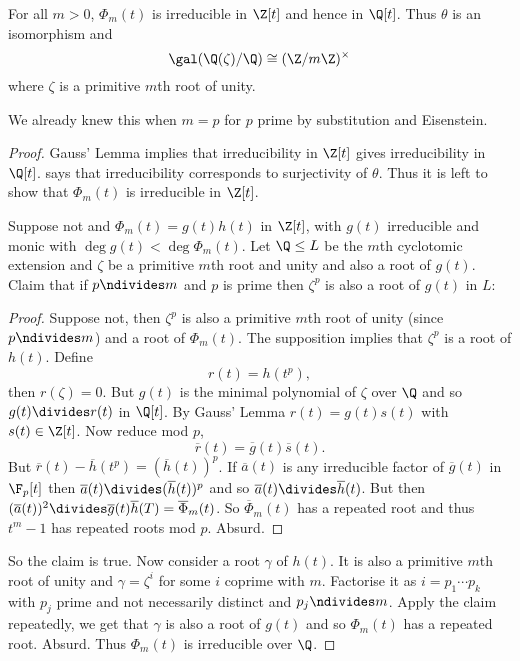 \documentclass[a4paper]{article}
\newcommand*{\red}[1]{\overline{#1}}
\begin{document}
\begin{theorem}
  \label{thm:cyclotomic extension of Q}
  For all \(m > 0\), \(\Phi_m(t)\) is irreducible in \(\Z[t]\) and hence in \(\Q[t]\). Thus \(\theta\) is an isomorphism and
  \[
    \gal(\Q(\zeta)/\Q) \cong (\Z/m\Z)^\times
  \]
  where \(\zeta\) is a primitive \(m\)th root of unity.
\end{theorem}

\begin{remark}
  We already knew this when \(m = p\) for \(p\) prime by substitution and Eisenstein.
\end{remark}

\begin{proof}
  Gauss' Lemma implies that irreducibility in \(\Z[t]\) gives irreducibility in \(\Q[t]\).  says that irreducibility corresponds to surjectivity of \(\theta\). Thus it is left to show that \(\Phi_m(t)\) is irreducible in \(\Z[t]\).

  Suppose not and \(\Phi_m(t) = g(t)h(t)\) in \(\Z[t]\), with \(g(t)\) irreducible and monic with \(\deg g(t) < \deg \Phi_m(t)\). Let \(\Q \leq L\) be the \(m\)th cyclotomic extension and \(\zeta\) be a primitive \(m\)th root and unity and also a root of \(g(t)\). Claim that if \(p \ndivides m\) and \(p\) is prime then \(\zeta^p\) is also a root of \(g(t)\) in \(L\):

  \begin{proof}
    Suppose not, then \(\zeta^p\) is also a primitive \(m\)th root of unity (since \(p \ndivides m\)) and a root of \(\Phi_m(t)\). The supposition implies that \(\zeta^p\) is a root of \(h(t)\). Define
    \[
      r(t) = h(t^p),
    \]
    then \(r(\zeta) = 0\). But \(g(t)\) is the minimal polynomial of \(\zeta\) over \(\Q\) and so \(g(t) \divides r(t)\) in \(\Q[t]\). By Gauss' Lemma \(r(t) = g(t)s(t)\) with \(s(t) \in \Z[t]\). Now reduce mod \(p\),
    \[
      \red r(t) = \red g(t) \red s(t).
    \]
    But \(\red r(t) - \red h(t^p) = (\red h(t))^p\). If \(\red a(t)\) is any irreducible factor of \(\red g(t)\) in \(\F_p[t]\) then \(\red a(t) \divides (\red h(t))^p\) and so \(\red a(t) \divides \red h(t)\). But then \((\red a(t))^2 \divides \red g(t) \red h(T) = \red \Phi_m(t)\). So \(\red \Phi_m(t)\) has a repeated root and thus \(t^m - 1\) has repeated roots mod \(p\). Absurd.
  \end{proof}
  
  So the claim is true. Now consider a root \(\gamma\) of \(h(t)\). It is also a primitive \(m\)th root of unity and \(\gamma = \zeta^i\) for some \(i\) coprime with \(m\). Factorise it as \(i = p_1 \cdots p_k\) with \(p_j\) prime and not necessarily distinct and \(p_j \ndivides m\). Apply the claim repeatedly, we get that \(\gamma\) is also a root of \(g(t)\) and so \(\Phi_m(t)\) has a repeated root. Absurd. Thus \(\Phi_m(t)\) is irreducible over \(\Q\).
\end{proof}
\end{document}
